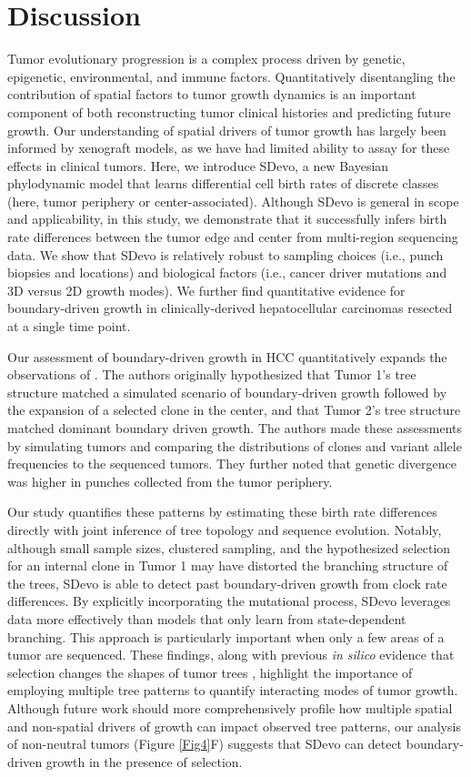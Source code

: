 \documentclass[12pt]{elife_based}
\begin{document}
\section*{Discussion}

Tumor evolutionary progression is a complex process driven by genetic, epigenetic, environmental, and immune factors. Quantitatively disentangling the contribution of spatial factors to tumor growth dynamics is an important component of both reconstructing tumor clinical histories and predicting future growth. Our understanding of spatial drivers of tumor growth has largely been informed by xenograft models, as we have had limited ability to assay for these effects in clinical tumors. Here, we introduce SDevo, a new Bayesian phylodynamic model that learns differential cell birth rates of discrete classes (here, tumor periphery or center-associated). Although SDevo is general in scope and applicability, in this study, we demonstrate that it successfully infers birth rate differences between the tumor edge and center from multi-region sequencing data. We show that SDevo is relatively robust to sampling choices (i.e., punch biopsies and locations) and biological factors (i.e., cancer driver mutations and 3D versus 2D growth modes). We further find quantitative evidence for boundary-driven growth in clinically-derived hepatocellular carcinomas resected at a single time point.

Our assessment of boundary-driven growth in HCC quantitatively expands the observations of \cite{Li2022}. The authors originally hypothesized that Tumor 1's tree structure matched a simulated scenario of  boundary-driven growth followed by the expansion of a selected clone in the center, and that Tumor 2's tree structure matched dominant boundary driven growth. The authors made these assessments by simulating tumors and comparing the distributions of clones and variant allele frequencies to the sequenced tumors. They further noted that genetic divergence was higher in punches collected from the tumor periphery. 

Our study quantifies these patterns by estimating these birth rate differences directly with joint inference of tree topology and sequence evolution. Notably, although small sample sizes, clustered sampling, and the hypothesized selection for an internal clone in Tumor 1 may have distorted the branching structure of the trees, SDevo is able to detect past boundary-driven growth from clock rate differences. By explicitly incorporating the mutational process, SDevo leverages data more effectively than models that only learn from state-dependent branching. This approach is particularly important when only a few areas of a tumor are sequenced. These findings, along with previous \textit{in silico} evidence that selection changes the shapes of tumor trees \citep{Chkhaidze:2019uw, yang2022lineage}, highlight the importance of employing multiple tree patterns to quantify interacting modes of tumor growth. Although future work should more comprehensively profile how multiple spatial and non-spatial drivers of growth can impact observed tree patterns, our analysis of non-neutral tumors (Figure \ref{Fig4}F) suggests that SDevo can detect boundary-driven growth in the presence of selection. 
\end{document}
